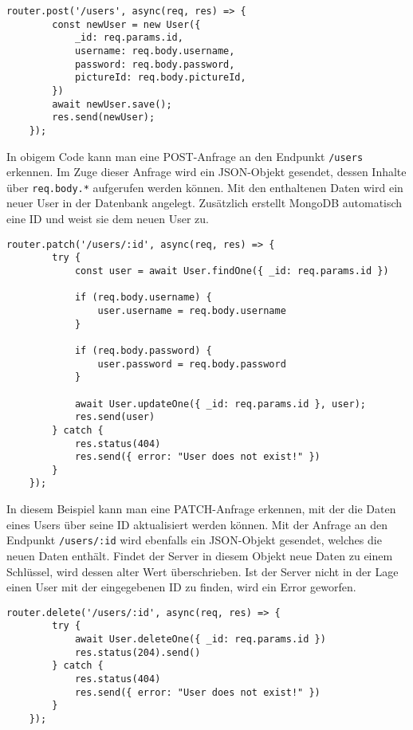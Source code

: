 \begin{lstlisting}[caption=POST-Request, label=lst:postrequest,float=!htb]
    router.post('/users', async(req, res) => {
        const newUser = new User({
            _id: req.params.id,
            username: req.body.username,
            password: req.body.password,
            pictureId: req.body.pictureId,
        })
        await newUser.save();
        res.send(newUser);
    });
\end{lstlisting}

In obigem Code kann man eine POST-Anfrage an den Endpunkt \texttt{/users} erkennen. Im Zuge dieser Anfrage wird ein JSON-Objekt gesendet, dessen Inhalte über \texttt{req.body.*} aufgerufen werden können. Mit den enthaltenen Daten wird ein neuer User in der Datenbank angelegt. Zusätzlich erstellt MongoDB automatisch eine ID und weist sie dem neuen User zu.

\begin{lstlisting}[caption=PATCH-Request, label=lst:patchrequest,float=!htb]
    router.patch('/users/:id', async(req, res) => {
        try {
            const user = await User.findOne({ _id: req.params.id })

            if (req.body.username) {
                user.username = req.body.username
            }

            if (req.body.password) {
                user.password = req.body.password
            }

            await User.updateOne({ _id: req.params.id }, user);
            res.send(user)
        } catch {
            res.status(404)
            res.send({ error: "User does not exist!" })
        }
    });
\end{lstlisting}

In diesem Beispiel kann man eine PATCH-Anfrage erkennen, mit der die Daten eines Users über seine ID aktualisiert werden können. Mit der Anfrage an den Endpunkt \texttt{/users/:id} wird ebenfalls ein JSON-Objekt gesendet, welches die neuen Daten enthält. Findet der Server in diesem Objekt neue Daten zu einem Schlüssel, wird dessen alter Wert überschrieben. Ist der Server nicht in der Lage einen User mit der eingegebenen ID zu finden, wird ein Error geworfen.

\begin{lstlisting}[caption=DELETE-Request, label=lst:deleterequest,float=!htb]
    router.delete('/users/:id', async(req, res) => {
        try {
            await User.deleteOne({ _id: req.params.id })
            res.status(204).send()
        } catch {
            res.status(404)
            res.send({ error: "User does not exist!" })
        }
    });
\end{lstlisting}

